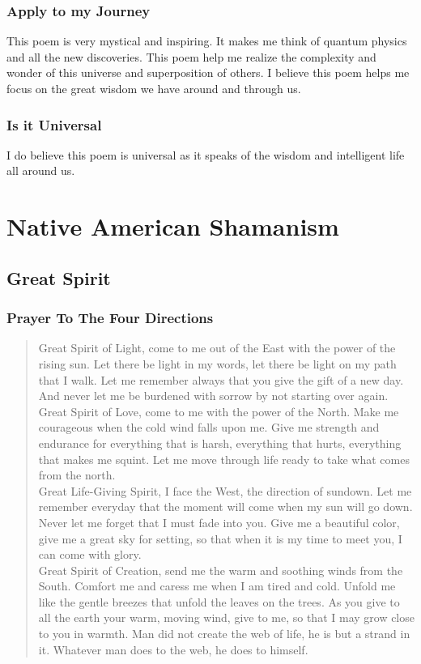 \documentclass[11pt,a4paper]{scrartcl} %
\begin{document}
\subsubsection{Apply to my Journey}
This poem is very mystical and inspiring. It makes me think of quantum physics and all the new discoveries. This poem help me realize the complexity and wonder of this universe and superposition of others. I believe this poem helps me focus on the great wisdom we have around and through us.
\subsubsection{Is it Universal}
I do believe this poem is universal as it speaks of the wisdom and intelligent life all around us. 
     \section{Native American Shamanism}
     \subsection{Great Spirit}
     \subsubsection{Prayer To The Four Directions}
\begin{verse}
 Great Spirit of Light, come to me out of the East with the power of the rising sun. Let there be light in my words, let there be light on my path that I walk. Let me remember always that you give the gift of a new day. And never let me be burdened with sorrow by not starting over again.\\

Great Spirit of Love, come to me with the power of the North. Make me courageous when the cold wind falls upon me. Give me strength and endurance for everything that is harsh, everything that hurts, everything that makes me squint. Let me move through life ready to take what comes from the north.\\

Great Life-Giving Spirit, I face the West, the direction of sundown. Let me remember everyday that the moment will come when my sun will go down. Never let me forget that I must fade into you. Give me a beautiful color, give me a great sky for setting, so that when it is my time to meet you, I can come with glory.\\

Great Spirit of Creation, send me the warm and soothing winds from the South. Comfort me and caress me when I am tired and cold. Unfold me like the gentle breezes that unfold the leaves on the trees. As you give to all the earth your warm, moving wind, give to me, so that I may grow close to you in warmth. Man did not create the web of life, he is but a strand in it. Whatever man does to the web, he does to himself. \\
\end{verse}
\textcolor{brown}{\citealp{native}}
\end{document}
